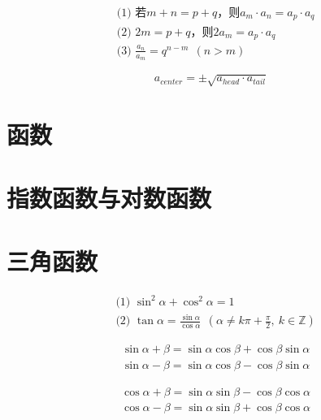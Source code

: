 \documentclass[a5paper]{article}
\begin{document}

\begin{align*}
    & \text{(1) 若} m+n = p+q \text{，则} a_m \cdot a_n = a_p \cdot a_q \\
    & \text{(2)~} 2m = p+q \text{，则} 2a_m = a_p \cdot a_q \\
    & \text{(3)~} \frac{a_n}{a_m} = q^{n-m} ~~(n>m)
\end{align*}

\begin{equation*}
    a_{center} = \pm\sqrt{a_{head} \cdot a_{tail}}
\end{equation*}


\section{{\large \textbf{函数}}}


\section{{\large \textbf{指数函数与对数函数}}}


\section{{\large \textbf{三角函数}}}


\begin{align*}
    & \text{(1) } \sin^2{\alpha} + \cos^2{\alpha} = 1 \\
    & \text{(2) } \tan{\alpha} = \frac{\sin{\alpha}}{\cos{\alpha}} ~~(\alpha \ne k\pi+\frac{\pi}{2},~k\in{}\mathbb{Z})
\end{align*}


\begin{align*}
    & \sin{\alpha + \beta} = \sin{\alpha}\cos{\beta} + \cos{\beta}\sin{\alpha} \\
    & \sin{\alpha - \beta} = \sin{\alpha}\cos{\beta} - \cos{\beta}\sin{\alpha}
\end{align*}


\begin{align*}
    & \cos{\alpha + \beta} = \sin{\alpha}\sin{\beta} - \cos{\beta}\cos{\alpha} \\
    & \cos{\alpha - \beta} = \sin{\alpha}\sin{\beta} + \cos{\beta}\cos{\alpha}
\end{align*}
\end{document}
